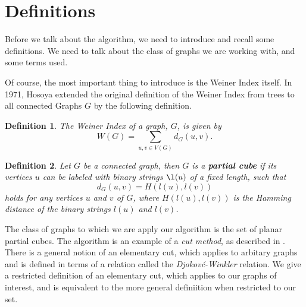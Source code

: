 \documentclass[11pt,a4paper]{article}
\newtheorem{definition}{Definition}
\begin{document}


\section{Definitions} \label{sec:definitions}

Before we talk about the algorithm, we need to introduce and recall some definitions. We need to talk about the class of graphs we are working with, and some terms used.

Of course, the most important thing to introduce is the Weiner Index itself. In 1971, Hosoya extended the original definition of the Weiner Index from trees to all connected Graphs $G$ by the following definition\cite{H1971}.

\begin{definition}
The Weiner Index of a graph, $G$, is given by $$W(G)=\sum_{u,v\in V(G)}d_G(u,v).$$
\end{definition}

\begin{definition}\cite{K2015}
Let $G$ be a connected graph, then $G$ is a {\bf partial cube} if its vertices $u$ can be labeled with binary strings $\l(u)$ of a fixed length, such that $$d_G(u, v)=H(l(u),l(v))$$ holds for any vertices $u$ and $v$ of $G$, where $H(l(u), l(v))$ is the Hamming distance of the binary strings $l(u)$ and $l(v)$.
\end{definition}



The class of graphs to which we are apply our algorithm is the set of planar partial cubes. The algorithm is an example of a \emph{cut method}, as described in \cite{K2015}. There is a general notion of an elementary cut, which applies to arbitary graphs and is defined in terms of a relation called the \emph{Djokov\'c-Winkler} relation. We give a restricted definition of an elementary cut, which applies to our graphs of interest, and is equivalent to the more general definiition when restricted to our set.
\end{document}
